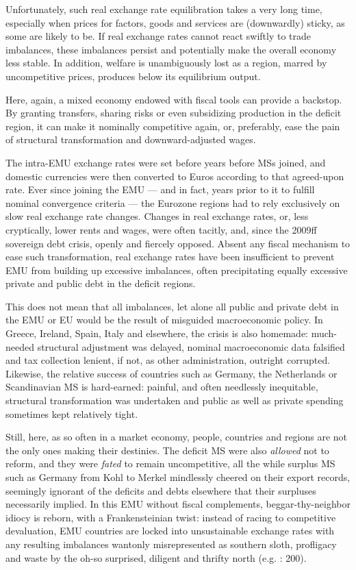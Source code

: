 \documentclass[11pt,a4paper,oneside,openright]{article}
\begin{document}
Unfortunately, such real exchange rate equilibration takes a very long time, especially when prices for factors, goods and services are (downwardly) sticky, as some are likely to be. 
If real exchange rates cannot react swiftly to trade imbalances, these imbalances persist and potentially make the overall economy less stable. 
In addition, welfare is unambiguously lost as a region, marred by uncompetitive prices, produces below its equilibrium output.

Here, again, a mixed economy endowed with fiscal tools can provide a backstop. 
By granting transfers, sharing risks or even subsidizing production in the deficit region, it can make it nominally competitive again, or, preferably, ease the pain of structural transformation and downward-adjusted wages. 

The intra-\gls{EMU} exchange rates were set before years before \glspl{MS} joined, and domestic currencies were then converted to Euros according to that agreed-upon rate. 
Ever since joining the \gls{EMU} --- and in fact, years prior to it to fulfill nominal convergence criteria --- the Eurozone regions had to rely exclusively on slow real exchange rate changes. 
Changes in real exchange rates, or, less cryptically, lower rents and wages, were often tacitly, and, since the 2009ff sovereign debt crisis, openly and fiercely opposed. 
Absent any fiscal mechanism to ease such transformation, real exchange rates have been insufficient to prevent \gls{EMU} from building up excessive imbalances, often precipitating equally excessive private and public debt in the deficit regions. 

This does not mean that all imbalances, let alone all public and private debt in the \gls{EMU} or \gls{EU} would be the result of misguided macroeconomic policy. 
In Greece, Ireland, Spain, Italy and elsewhere, the crisis is also homemade: 
much-needed structural adjustment was delayed, nominal macroeconomic data falsified and tax collection lenient, if not, as other administration, outright corrupted. 
Likewise, the relative success of countries such as Germany, the Netherlands or Scandinavian \gls{MS} is hard-earned: 
painful, and often needlessly inequitable, structural transformation was undertaken and public as well as private spending sometimes kept relatively tight.

Still, here, as so often in a market economy, people, countries and regions are not the only ones making their destinies. 
The deficit \gls{MS} were also \emph{allowed} not to reform, and they were \emph{fated} to remain uncompetitive, all the while surplus \gls{MS} such as Germany from Kohl to Merkel mindlessly cheered on their export records, seemingly ignorant of the deficits and debts elsewhere that their surpluses necessarily implied. 
In this \gls{EMU} without fiscal complements, beggar-thy-neighbor idiocy is reborn, with a Frankensteinian twist: 
instead of racing to competitive devaluation, \gls{EMU} countries are locked into unsustainable exchange rates with any resulting imbalances wantonly misrepresented as southern sloth, profligacy and waste by the oh-so surprised, diligent and thrifty north (e.g. \citealt{Featherstone2011}: 200).
\end{document}
